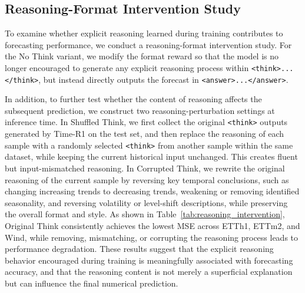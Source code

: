 


\subsection{Reasoning-Format Intervention Study}
To examine whether explicit reasoning learned during training contributes to forecasting performance, we conduct a reasoning-format intervention study. For the No Think variant, we modify the format reward so that the model is no longer encouraged to generate any explicit reasoning process within \texttt{<think>...</think>}, but instead directly outputs the forecast in \texttt{<answer>...</answer>}. 

In addition, to further test whether the content of reasoning affects the subsequent prediction, we construct two reasoning-perturbation settings at inference time. In Shuffled Think, we first collect the original \texttt{<think>} outputs generated by Time-R1 on the test set, and then replace the reasoning of each sample with a randomly selected \texttt{<think>} from another sample within the same dataset, while keeping the current historical input unchanged. This creates fluent but input-mismatched reasoning. In Corrupted Think, we rewrite the original reasoning of the current sample by reversing key temporal conclusions, such as changing increasing trends to decreasing trends, weakening or removing identified seasonality, and reversing volatility or level-shift descriptions, while preserving the overall format and style. As shown in Table~\ref{tab:reasoning_intervention}, Original Think consistently achieves the lowest MSE across ETTh1, ETTm2, and Wind, while removing, mismatching, or corrupting the reasoning process leads to performance degradation. These results suggest that the explicit reasoning behavior encouraged during training is meaningfully associated with forecasting accuracy, and that the reasoning content is not merely a superficial explanation but can influence the final numerical prediction.

